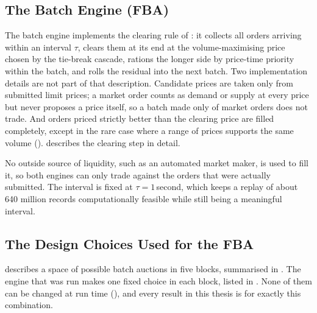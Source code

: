 \subsection{The Batch Engine (FBA)}

The batch engine implements the clearing rule of : it
collects all orders arriving within an interval $\tau$, clears them at its
end at the volume-maximising price chosen by the tie-break cascade, rations
the longer side by price-time priority within the batch, and rolls the
residual into the next batch. Two implementation details are not part of that
description. Candidate prices are taken only from submitted limit prices; a
market order counts as demand or supply at every price but never proposes a
price itself, so a batch made only of market orders does not trade. And orders
priced strictly better than the clearing price are filled completely, except
in the rare case where a range of prices supports the same volume
().  describes the clearing step in
detail.

No outside
source of liquidity, such as an automated market maker, is used to fill it, so
both engines can only trade against the orders that were actually submitted.
The interval is fixed at $\tau=1$\,second, which keeps a replay of about 640
million records computationally feasible while still being a meaningful
interval.

\subsection{The Design Choices Used for the FBA}
\label{sec:fbachoices}

 describes a space of possible batch auctions in five blocks,
summarised in . The engine that was run makes one fixed
choice in each block, listed in . None of them can be changed at run time
(), and every result in this thesis is for exactly this
combination.


